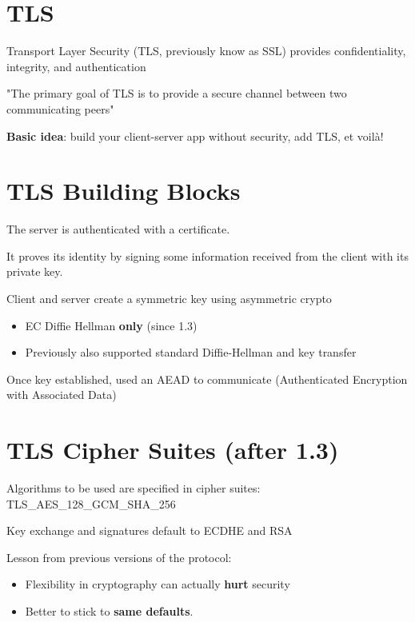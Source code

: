 \documentclass[11pt]{article}
\begin{document}
\vspace{1cm}

\section*{TLS}

Transport Layer Security (TLS, previously know as SSL) provides confidentiality, integrity, and authentication

"The primary goal of TLS is to provide a secure channel between two communicating peers"

\textbf{Basic idea}: build your client-server app without security, add TLS, et voilà!

\section*{TLS Building Blocks}

The server is authenticated with a certificate. 

It proves its identity by signing some information received from the client with its private key. 

Client and server create a symmetric key using asymmetric crypto
\begin{itemize}
	\item EC Diffie Hellman \textbf{only} (since 1.3)
	\item Previously also supported standard Diffie-Hellman and key transfer
\end{itemize}

Once key established, used an AEAD to communicate (Authenticated Encryption with Associated Data)

\section*{TLS Cipher Suites (after 1.3)}

Algorithms to be used are specified in cipher suites: TLS\_AES\_128\_GCM\_SHA\_256

Key exchange and signatures default to ECDHE and RSA

Lesson from previous versions of the protocol:
\begin{itemize}
	\item Flexibility in cryptography can actually \textbf{hurt} security
	\item Better to stick to \textbf{same defaults}.
\end{itemize}
\end{document}
